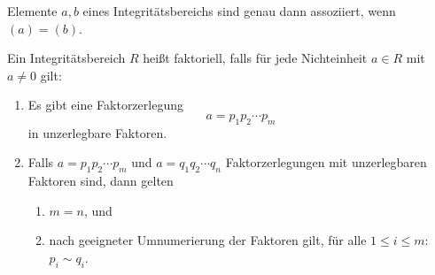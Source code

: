 \documentclass{book}
\begin{document}
\begin{rem}
    \label{rem:ass}
    Elemente $a,b$ eines Integritätsbereichs sind genau dann assoziiert, wenn
    $(a) = (b)$. 
\end{rem}

\begin{defi}
    \label{defi:faktoriell}
    Ein Integritätsbereich $R$ heißt faktoriell, falls für jede Nichteinheit $a \in R$ mit $a \ne 0$ gilt:
    \begin{enumerate}
        \item Es gibt eine Faktorzerlegung
           \begin{equation}
               \label{eq:faktor}
                a = p_1 p_2 \cdots p_m
           \end{equation}
            in unzerlegbare Faktoren.
        \item Falls $a = p_1 p_2 \cdots p_m$ und $a = q_1 q_2 \cdots q_n$
            Faktorzerlegungen mit unzerlegbaren Faktoren sind, dann gelten
            \begin{enumerate}[label=\arabic*.]
                \item $m = n$, und
                \item nach geeigneter Umnumerierung der Faktoren gilt, für alle
                    $1 \le i \le m$: $p_i \sim q_i$.
            \end{enumerate} 
    \end{enumerate}
\end{defi}
\end{document}
